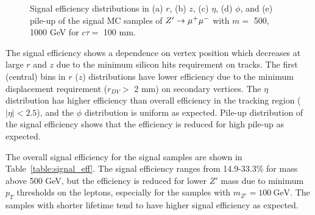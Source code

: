 \begin{figure}[!htb]
    \caption{Signal efficiency distributions in (a) $r$, (b) $z$, (c) $\eta$, (d) $\phi$, and (e) pile-up of the signal MC samples of $Z'\rightarrow \mu^{+}\mu^{-}$ with $m=$ 500, 1000 GeV for $c\tau=$ 100 mm.}
    \label{fig:signal_vertex_dist}
\end{figure}

The signal efficiency shows a dependence on vertex position which decreases at large $r$ and $z$ due to the minimum silicon hits requirement on tracks. The first (central) bins in $r$ ($z$) distributions have lower efficiency due to the minimum displacement requirement ($r_{DV} > $ 2 mm) on secondary vertices. The $\eta$ distribution has higher efficiency than overall efficiency in the tracking region ($|\eta| < 2.5$), and the $\phi$ distribution is uniform as expected. Pile-up distribution of the signal efficiency shows that the efficiency is reduced for high pile-up as expected.

The overall signal efficiency for the signal samples are shown in Table~\ref{table:signal_eff}. The signal efficiency ranges from 14.9-33.3\% for mass above 500 GeV, but the efficiency is reduced for lower $Z'$ mass due to minimum $p_{T}$ thresholds on the leptons, especially for the samples with $m_{Z'}=100~\si{\GeV}$. The samples with shorter lifetime tend to have higher signal efficiency as expected. 

